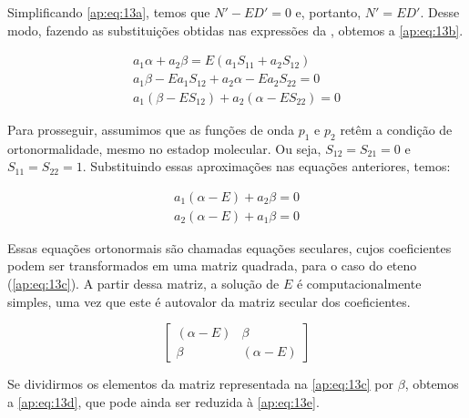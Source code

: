 Simplificando \autoref{ap:eq:13a}, temos que $N' - ED' = 0$ e, portanto, $N' = ED'$. Desse modo, fazendo as substituições obtidas nas expressões da  \label{ap:eq:13a}, obtemos a \autoref{ap:eq:13b}.

\begin{figure}[htb]
    \vspace{2\baselineskip}
\begin{align}
\label{ap:eq:13b}
    a_1 \alpha + a_2 \beta = E(a_1 S_{11} + a_2 S_{12}) \\[0.35cm]
    a_1 \beta - E a_1 S_{12} + a_2 \alpha - E a_2 S_{22} = 0 \\[0.35cm]
    a_1 (\beta - ES_{12}) + a_2 (\alpha - ES_{22}) = 0
\end{align}
\end{figure}

Para prosseguir, assumimos que as funções de onda $p_1$ e $p_2$ retêm a condição de ortonormalidade, mesmo no estadop molecular. Ou seja, $S_{12} = S_{21} = 0$ e $S_{11} = S_{22} = 1$. Substituindo essas aproximações nas equações anteriores, temos:

\begin{figure}[htb]
    \vspace{2\baselineskip}
\begin{align}
\label{ap:eq:13b}
    a_1 (\alpha - E) + a_2 \beta = 0 \\[0.35cm]
    a_2 (\alpha - E) + a_1 \beta = 0
\end{align}
\end{figure}

Essas equações ortonormais são chamadas equações seculares, cujos coeficientes podem ser transformados em uma matriz quadrada, para o caso do eteno (\autoref{ap:eq:13c}). A partir dessa matriz, a solução de $E$ é computacionalmente simples, uma vez que este é autovalor da matriz secular dos coeficientes.

\begin{equation}
\label{ap:eq:13c}
\begin{bmatrix}
    (\alpha - E) & \beta \\
    \beta  & (\alpha - E)
\end{bmatrix}
\end{equation}

Se dividirmos os elementos da matriz representada na \autoref{ap:eq:13c} por $\beta$, obtemos a \autoref{ap:eq:13d}, que pode ainda ser reduzida à \autoref{ap:eq:13e}.


